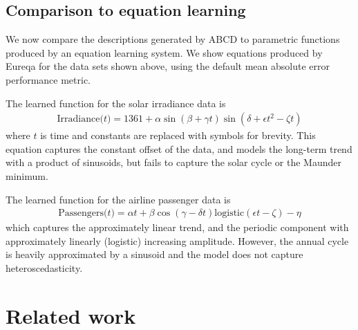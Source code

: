 \documentclass[letterpaper]{article}
\newcommand{\procedurename}{ABCD}
\begin{document}
\subsection{Comparison to equation learning}
\label{sec:eqn-learning-comp}

We now compare the descriptions generated by \procedurename{} to parametric functions produced by an equation learning system.
We show equations produced by Eureqa \citep{Eureqa} for the data sets shown above, using the default mean absolute error performance metric.


The learned function for the solar irradiance data is
\begin{align*}
\textrm{Irradiance($t$)} = 1361 + \alpha\sin(\beta + \gamma t)\sin(\delta + \epsilon t^2 - \zeta t)
\end{align*}
where $t$ is time and constants are replaced with symbols for brevity.
This equation captures the constant offset of the data, and models the long-term trend with a product of sinusoids, but fails to capture the solar cycle or the Maunder minimum.

The learned function for the airline passenger data is
\begin{align*}
\textrm{Passengers($t$)} = \alpha t + \beta\cos(\gamma - \delta t)\textrm{logistic}(\epsilon t - \zeta) - \eta
\end{align*}
which captures the approximately linear trend, and the periodic component with approximately linearly (logistic) increasing amplitude.
However, the annual cycle is heavily approximated by a sinusoid and the model does not capture heteroscedasticity.

\section{Related work}
\label{sec:related-work}
\end{document}
